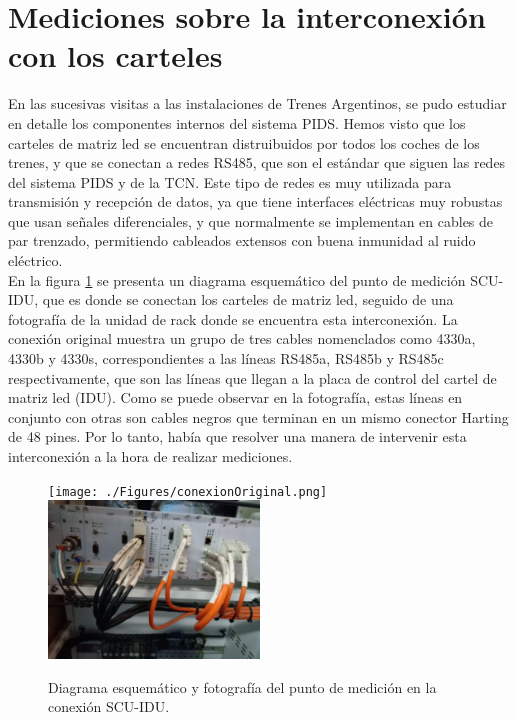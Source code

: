 \section{Mediciones sobre la interconexión con los carteles}

En las sucesivas visitas a las instalaciones de Trenes Argentinos, se pudo estudiar en detalle los componentes internos del sistema PIDS. Hemos visto que los carteles de matriz led se encuentran distruibuidos por todos los coches de los trenes, y que se conectan a redes RS485, que son el estándar que siguen las redes del sistema PIDS y de la TCN. Este tipo de redes es muy utilizada para transmisión y recepción de datos, ya que tiene interfaces eléctricas muy robustas que usan señales diferenciales, y que normalmente se implementan en cables de par trenzado, permitiendo cableados extensos con buena inmunidad al ruido eléctrico.  \\

En la figura \ref{fig:conexionOriginal} se presenta un diagrama esquemático del punto de medición SCU-IDU, que es donde se conectan los carteles de matriz led, seguido de una fotografía de la unidad de rack donde se encuentra esta interconexión. La conexión original muestra un grupo de tres cables nomenclados como 4330a, 4330b y 4330s, correspondientes a las líneas RS485a, RS485b y RS485c respectivamente, que son las líneas que llegan a la placa de control del cartel de matriz led (IDU). Como se puede observar en la fotografía, estas líneas en conjunto con otras son cables negros que terminan en un mismo conector Harting de 48 pines. Por lo tanto, había que resolver una manera de intervenir esta interconexión a la hora de realizar mediciones.\\

\begin{figure}[H]
	\centering
      \texttt{[image: ./Figures/conexionOriginal.png]}
      \includegraphics[width=0.5\textwidth]{./Figures/rackPIDS2.jpg}
	\caption{Diagrama esquemático y fotografía del punto de medición en la conexión SCU-IDU.}
	\label{fig:conexionOriginal}
\end{figure}


